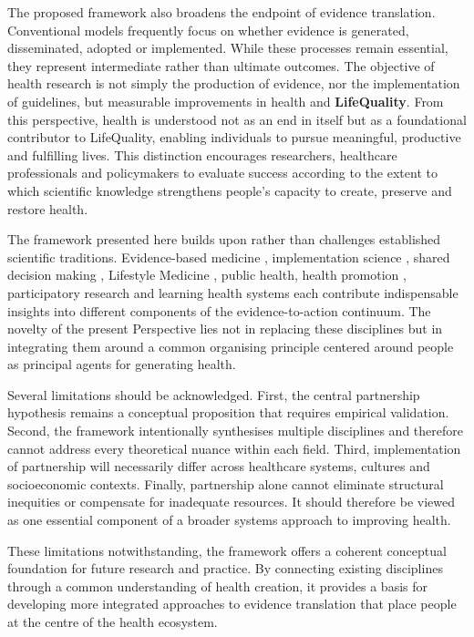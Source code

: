 \documentclass{article}
\begin{document}
The proposed framework also broadens the endpoint of evidence translation. Conventional models frequently focus on whether evidence is generated, disseminated, adopted or implemented. While these processes remain essential, they represent intermediate rather than ultimate outcomes. The objective of health research is not simply the production of evidence, nor the implementation of guidelines, but measurable improvements in health and \textbf{\textbf{LifeQuality}}. From this perspective, health is understood not as an end in itself but as a foundational contributor to LifeQuality, enabling individuals to pursue meaningful, productive and fulfilling lives. This distinction encourages researchers, healthcare professionals and policymakers to evaluate success according to the extent to which scientific knowledge strengthens people's capacity to create, preserve and restore health.

The framework presented here builds upon rather than challenges established scientific traditions. Evidence-based medicine \cite{Sackett1996}, implementation science \cite{Eccles2006} \cite{Nilsen2015}, shared decision making \cite{Elwyn2012}, Lifestyle Medicine \cite{Katz2009}, public health, health promotion \cite{WHO1986}, participatory research and learning health systems \cite{IOM2013} each contribute indispensable insights into different components of the evidence-to-action continuum. The novelty of the present Perspective lies not in replacing these disciplines but in integrating them around a common organising principle centered around people as principal agents for generating health.

Several limitations should be acknowledged. First, the central partnership hypothesis remains a conceptual proposition that requires empirical validation. Second, the framework intentionally synthesises multiple disciplines and therefore cannot address every theoretical nuance within each field. Third, implementation of partnership will necessarily differ across healthcare systems, cultures and socioeconomic contexts. Finally, partnership alone cannot eliminate structural inequities or compensate for inadequate resources. It should therefore be viewed as one essential component of a broader systems approach to improving health.

These limitations notwithstanding, the framework offers a coherent conceptual foundation for future research and practice. By connecting existing disciplines through a common understanding of health creation, it provides a basis for developing more integrated approaches to evidence translation that place people at the centre of the health ecosystem.
\end{document}

